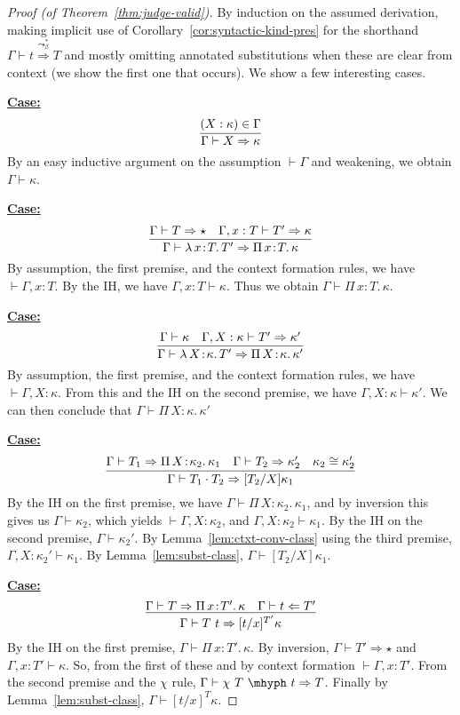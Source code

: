 \documentclass{article}
\newcommand{\abs}[4]{{#1}\, #2\! : \! #3.\, #4}
\newcommand{\tpcheck}[0]{\Leftarrow}
\newcommand{\tpsynth}[0]{\Rightarrow}
\newcommand{\tpsynthleads}[0]{\ensuremath{\overset{\leadsto_\beta^*}{\Rightarrow}}}
\newcommand{\startcase}[1]{\vspace{#1} \noindent\textbf{\underline{Case:}}}
\begin{document}
\begin{proof}[Proof (of Theorem~\ref{thm:judge-valid})]
  By induction on the assumed derivation, making implicit use of
  Corollary~\ref{cor:syntactic-kind-pres} for the shorthand \(\Gamma \vdash t
  \tpsynthleads T\) and mostly omitting annotated substitutions when these are
  clear from context (we show the first one that occurs).
  We show a few interesting cases.

  \startcase{.2cm}
  \[
    \infer{\Gamma \vdash X \tpsynth \kappa}{(X : \kappa) \in \Gamma}
  \]
  By an easy inductive argument on the assumption \(\vdash \Gamma\) and
  weakening, we obtain \(\Gamma \vdash \kappa\).

  \startcase{.2cm}
  \[
    \infer{\Gamma\vdash\abs{\lambda}{x}{T}{T'} \tpsynth \abs{\Pi}{x}{T}{\kappa}}{\Gamma \vdash T \tpsynth \star & \Gamma,x:T\vdash T'\tpsynth\kappa}
  \]
  By assumption, the first premise, and the context formation rules, we have
  \(\vdash \Gamma,x:T\).
  By the IH, we have \(\Gamma,x:T \vdash \kappa\).
  Thus we obtain \(\Gamma \vdash \abs{\Pi}{x}{T}{\kappa}\).

  \startcase{.2cm}
  \[
    \infer{\Gamma\vdash\abs{\lambda}{X}{\kappa}{T'} \tpsynth \abs{\Pi}{X}{\kappa}{\kappa'}}{\Gamma \vdash \kappa & \Gamma,X:\kappa\vdash T'\tpsynth\kappa'}
  \]
  By assumption, the first premise, and the context formation rules, we have
  \(\vdash \Gamma,X:\kappa\).
  From this and the IH on the second premise, we have \(\Gamma,X:\kappa \vdash
  \kappa'\).
  We can then conclude that \(\Gamma \vdash \abs{\Pi}{X}{\kappa}{\kappa'}\)

  
  \startcase{.2cm}
  \[
    \infer{\Gamma\vdash T_1 \cdot T_2 \tpsynth [T_2/X]\kappa_1}{\Gamma\vdash T_1 \tpsynth \abs{\Pi}{X}{\kappa_2}{\kappa_1} & \Gamma\vdash T_2 \tpsynth \kappa_2' & \kappa_2 \cong \kappa_2'}
  \]
  By the IH on the first premise, we have \(\Gamma \vdash
  \abs{\Pi}{X}{\kappa_2}{\kappa_1}\), and by inversion this gives us \(\Gamma
  \vdash \kappa_2\), which yields \(\vdash \Gamma,X:\kappa_2\), and
  \(\Gamma,X:\kappa_2 \vdash \kappa_1\).
  By the IH on the second premise, \(\Gamma \vdash \kappa_2'\).
  By Lemma~\ref{lem:ctxt-conv-class} using the third premise,
  \(\Gamma,X:\kappa_2' \vdash \kappa_1\).
  By Lemma~\ref{lem:subst-class}, \(\Gamma \vdash [T_2/X]\kappa_1\).

  \startcase{.2cm}
  \[
    \infer{\Gamma\vdash T\ t \tpsynth [t/x]^{T'}\kappa}{\Gamma\vdash T \tpsynth \abs{\Pi}{x}{T'}{\kappa} & \Gamma\vdash t \tpcheck T'}
  \]
  By the IH on the first premise, \(\Gamma \vdash \abs{\Pi}{x}{T'}{\kappa}\).
  By inversion, \(\Gamma \vdash T' \tpsynth \star\) and \(\Gamma,x:T' \vdash
  \kappa\).
  So, from the first of these and by context formation \(\vdash \Gamma,x:T'\).
  From the second premise and the \(\chi\) rule, \(\Gamma \vdash \chi\ T\
  \mhyph\ t \tpsynth T\).
  Finally by Lemma~\ref{lem:subst-class}, \(\Gamma \vdash [t/x]^{T} \kappa\).


\end{proof}
\end{document}
